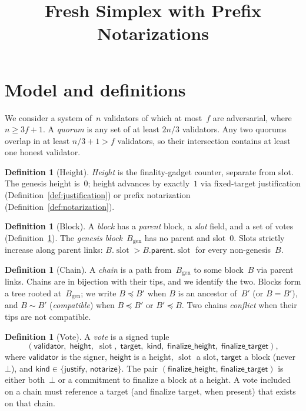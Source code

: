 \ifx\litemode\undefined\documentclass{article}\fi
\title{Fresh Simplex with Prefix Notarizations}
\newcommand{\genesis}{\ensuremath{B_{\mathrm{gen}}}}
\newcommand{\slot}[0]{\ensuremath{\operatorname{\mathrm{slot}}}}
\newcommand{\target}{\mathsf{target}}
\newcommand{\kind}{\mathsf{kind}}
\newcommand{\height}{\mathsf{height}}
\newcommand{\validator}{\mathsf{validator}}
\newcommand{\just}{\ensuremath{\mathsf{justify}}\xspace}
\newcommand{\notar}{\ensuremath{\mathsf{notarize}}\xspace}
\newcommand{\parent}{\mathsf{parent}}
\newcommand{\finalizeHeight}{\mathsf{finalize\_height}}
\newcommand{\finalizeTarget}{\mathsf{finalize\_target}}
\theoremstyle{plain}
\theoremstyle{definition}
\newtheorem{definition}[theorem]{Definition}
\theoremstyle{remark}
\begin{document}
\maketitle

\section{Model and definitions}

We consider a system of~$n$ validators of which at most~$f$ are adversarial, where $n \geq 3f + 1$.
A \emph{quorum} is any set of at least $2n/3$ validators.
Any two quorums overlap in at least $n/3 + 1 > f$ validators, so their intersection contains at least one honest validator.

\begin{definition}[Height]\label{def:height}
\emph{Height} is the finality-gadget counter, separate from slot.
The genesis height is~$0$; height advances by exactly~$1$ via fixed-target justification (Definition~\ref{def:justification}) or prefix notarization (Definition~\ref{def:notarization}).
\end{definition}

\begin{definition}[Block]\label{def:block}
A \emph{block} has a \emph{parent} block, a \emph{slot} field, and a set of votes (Definition~\ref{def:vote}).
The \emph{genesis block}~$\genesis$ has no parent and slot~$0$.
Slots strictly increase along parent links: $B.\slot > B.\parent.\slot$ for every non-genesis~$B$.
\end{definition}

\begin{definition}[Chain]\label{def:chain}
A \emph{chain} is a path from~$\genesis$ to some block~$B$ via parent links.
Chains are in bijection with their tips, and we identify the two.
Blocks form a tree rooted at~$\genesis$; we write $B \preceq B'$ when $B$ is an ancestor of~$B'$ (or $B = B'$), and $B \sim B'$ (\emph{compatible}) when $B \preceq B'$ or $B' \preceq B$.
Two chains \emph{conflict} when their tips are not compatible.
\end{definition}

\begin{definition}[Vote]\label{def:vote}
A \emph{vote} is a signed tuple
\[
  (\validator,\; \height,\; \slot,\; \target,\; \kind,\; \finalizeHeight,\; \finalizeTarget),
\]
where $\validator$ is the signer, $\height$ is a height, $\slot$ a slot, $\target$ a block (never~$\bot$), and $\kind \in \{\just,\, \notar\}$.
The pair $(\finalizeHeight,\, \finalizeTarget)$ is either both~$\bot$ or a commitment to finalize a block at a height.
A vote included on a chain must reference a target (and finalize target, when present) that exists on that chain.
\end{definition}
\end{document}
